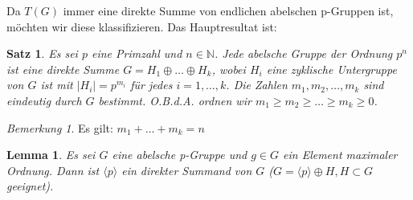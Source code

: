 \documentclass[12pt]{scrartcl} %
\newtheorem{thm}{Satz}
\newtheorem{lemma}{Lemma}
\theoremstyle{definition}
\theoremstyle{remark}
\newtheorem*{nb}{Bemerkung}
\begin{document}
Da $T(G)$ immer eine direkte Summe von endlichen abelschen p-Gruppen ist, möchten wir diese klassifizieren. Das Hauptresultat ist:

\begin{thm}
Es sei $p$ eine Primzahl und $n\in \mathbb{N}$. 
Jede abelsche Gruppe der Ordnung $p^n$ ist eine direkte Summe $G=H_{1}\oplus \dots\oplus H_{k}$, wobei $H_{i}$ eine zyklische Untergruppe von $G$ ist mit $|H_{i}|=p^{m_{i}}$ für jedes $i=1,\dots,k$.
Die Zahlen $m_1,m_2,\dots,m_k$ sind eindeutig durch $G$ bestimmt. O.B.d.A. ordnen wir $m_{1}\geq m_{2}\geq \dots\geq m_{k}\geq 0$.
\end{thm}

\begin{nb}
Es gilt: $m_{1}+\dots+m_{k}=n$
\end{nb}

\begin{lemma}
Es sei $G$ eine abelsche p-Gruppe und $g\in G$ ein Element maximaler Ordnung. 
Dann ist $\langle p\rangle$ ein direkter Summand von $G$ ($G=\langle p\rangle\oplus H, H\subset G$ geeignet).
\end{lemma}
\end{document}
